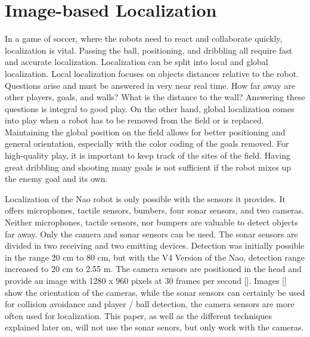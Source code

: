 \documentclass[12pt, a4paper, doc]{apa6}
\begin{document}
  \section{Image-based Localization}
  In a game of soccer, where the robots need to react and collaborate quickly, localization is vital. Passing the ball, positioning, and dribbling all require fast and accurate localization. Localization can be split into local and global localization. Local localization focuses on objects distances relative to the robot. Questions arise and must be answered in very near real time. How far away are other players, goals, and walls? What is the distance to the wall? Answering these questions is integral to good play. On the other hand, global localization comes into play when a robot has to be removed from the field or is replaced. Maintaining the global position on the field allows for better positioning and general orientation, especially with the color coding of the goals removed. For high-quality play, it is important to keep track of the sites of the field. Having great dribbling and shooting many goals is not sufficient if the robot mixes up the enemy goal and its own.

  Localization of the Nao robot is only possible with the sensors it provides. It offers microphones, tactile sensors, bumbers, four sonar sensors, and two cameras. Neither microphones, tactile sensors, nor bumpers are valuable to detect objects far away. Only the camera and sonar sensors can be used. The sonar sensors are divided in two receiving and two emitting devices. Detection was initially possible in the range 20 cm to 80 cm, but with the V4 Version of the Nao, detection range increased to 20 cm to 2.55 m. The camera sensors are positioned in the head and provide an image with 1280 x 960 pixels at 30 frames per second []. Images [] show the orientation of the cameras, while the sonar sensors can certainly be used for collision avoidance and player / ball detection, the camera sensors are more often used for localization. This paper, as well as the different techniques explained later on, will not use the sonar senors, but only work with the cameras.
\end{document}

